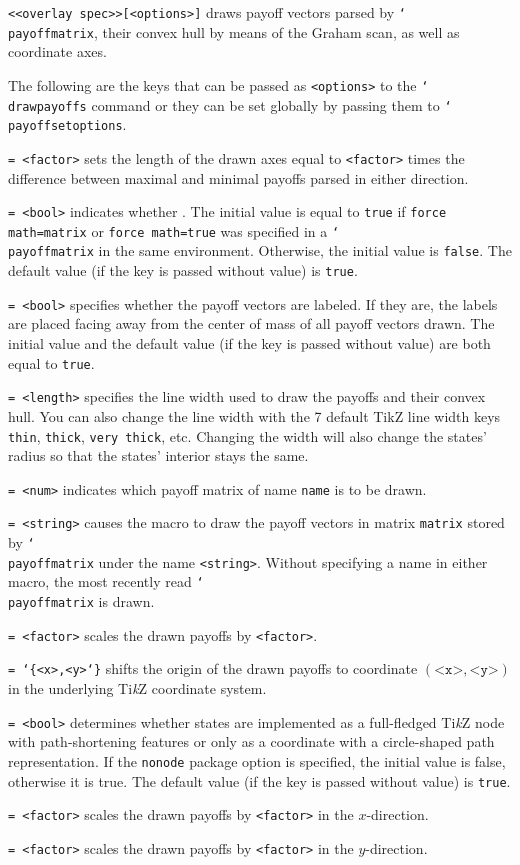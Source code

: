 \documentclass{article}
\newenvironment{desc}{\itemize[leftmargin=50pt]}{\enditemize}
\def\macroarg#1#2{\item[\cmd{#1}] \hskip-2.5pt\texttt{#2}}
\def\option#1#2{\item[\texttt{#1}] \hskip-1.5pt\texttt{#2}}
\renewcommand{\textbackslash}{\char`\\}
\def\cmd#1{\texttt{\color{cmd}\textbackslash#1}}
\def\leftbrace{\char`\{}
\def\rightbrace{\char`\}}
\def\arg#1{{\color{cmd}\leftbrace}{\color{black}#1}{\color{cmd}\rightbrace}}
\def\optarg[#1]{{\color{player1}[#1]}}
\def\TikZ{Ti\emph{k}Z\xspace}
\begin{document}
\begin{desc}
\macroarg{drawpayoffs}{<<overlay spec>>\optarg[<options>]} draws payoff vectors parsed by \cmd{payoffmatrix}, their convex hull by means of the Graham scan, as well as coordinate axes.
\end{desc}

\noindent The following are the keys that can be passed as \texttt{<options>} to the \cmd{drawpayoffs} command or they can be set globally by passing them to \cmd{payoffsetoptions}.

\begin{desc}
\option{axis}{= <factor>} sets the length of the drawn axes equal to \texttt{<factor>} times the difference between maximal and minimal payoffs parsed in either direction.

\option{force math}{= <bool>} indicates whether . The initial value is equal to \texttt{true} if \texttt{force math=matrix} or \texttt{force math=true} was specified in a \cmd{payoffmatrix} in the same environment. Otherwise, the initial value is \texttt{false}. The default value (if the key is passed without value) is \texttt{true}. 

\option{labels}{= <bool>} specifies whether the payoff vectors are labeled. If they are, the labels are placed facing away from the center of mass of all payoff vectors drawn. The initial value and the default value (if the key is passed without value) are both equal to \texttt{true}.

\option{line width}{= <length>} specifies the line width used to draw the payoffs and their convex hull. You can also change the line width with the 7 default TikZ line width keys \texttt{thin}, \texttt{thick}, \texttt{very thick}, etc. Changing the width will also change the states' radius so that the states' interior stays the same.

\option{matrix}{= <num>} indicates which payoff matrix of name \texttt{name} is to be drawn.

\option{name}{= <string>} causes the macro to draw the payoff vectors in matrix \texttt{matrix} stored by \cmd{payoffmatrix} under the name \texttt{<string>}. Without specifying a name in either macro, the most recently read \cmd{payoffmatrix} is drawn.

\option{scale}{= <factor>} scales the drawn payoffs by \texttt{<factor>}.

\option{shift}{= \arg{<x>,<y>}} shifts the origin of the drawn payoffs to coordinate $(\texttt{<x>},\texttt{<y>})$ in the underlying \TikZ coordinate system.

\option{tikz nodes}{= <bool>} determines whether states are implemented as a full-fledged \TikZ node with path-shortening features or only as a coordinate with a circle-shaped path representation. If the \texttt{nonode} package option is specified, the initial value is false, otherwise it is true. The default value (if the key is passed without value) is \texttt{true}. 

\option{xscale}{= <factor>} scales the drawn payoffs by \texttt{<factor>} in the $x$-direction.

\option{yscale}{= <factor>} scales the drawn payoffs by \texttt{<factor>} in the $y$-direction.
\end{desc}
\end{document}
